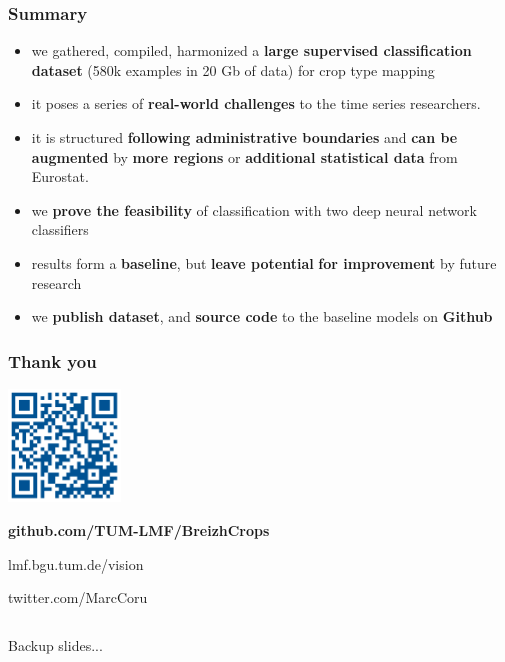 \documentclass[%
  aspectratio=169,
  9pt,
  USenglish,
  titlegraphic, %
  affiliationintitlepagehead,
  affiliation,
]{beamer}
\begin{document}
\begin{frame}
	\frametitle{Summary}
	
	\Large
	
	\begin{itemize}[itemsep=.5em]
	\item<1-> we gathered, compiled, harmonized a \textbf{large supervised classification dataset} (580k examples in 20 Gb of data) for crop type mapping
	\item<2-> it poses a series of \textbf{real-world challenges} to the time series researchers.
	\item<3-> it is structured \textbf{following administrative boundaries} and \textbf{can be augmented} by \textbf{more regions} or \textbf{additional statistical data} from Eurostat.
	\item<4-> we \textbf{prove the feasibility} of classification with two deep neural network classifiers
	\item<5-> results form a \textbf{baseline}, but \textbf{leave potential} \textbf{for improvement} by future research
	\item<6-> we \textbf{publish dataset}, and \textbf{source code} to the baseline models on \textbf{Github}
	\end{itemize}
	
	
\end{frame}

\begin{frame}
	\frametitle{Thank you}
	
	\centering
	\includegraphics[width=3cm]{images/qrcode}
	
	\Large\textbf{github.com/TUM-LMF/BreizhCrops}
	
	\Large
	lmf.bgu.tum.de/vision
	
	twitter.com/MarcCoru
\end{frame}

\appendix

{
	\begin{frame}[plain]
	
	\vfill
	\Huge\color{white}
	\begin{center}
		\begin{columns}
			\vspace{7em}
			
			\hfill 
			Backup slides...
			
		\end{columns}
	\end{center}
	
	\vfill
\end{frame}
}
\end{document}
